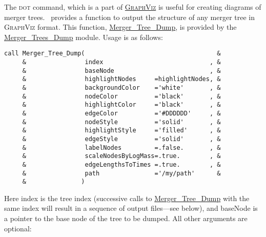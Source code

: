 The {\normalfont \scshape dot} command, which is a part of \href{http://www.graphviz.org/}{{\normalfont \scshape GraphViz}} is useful for creating diagrams of merger trees. \glc\ provides a function to output the structure of any merger tree in {\normalfont \scshape GraphViz} format. This function, \hyperlink{objects.merger_trees.dump.F90:merger_trees_dump:merger_tree_dump}{{\normalfont \ttfamily Merger\_Tree\_Dump}}, is provided by the \hyperlink{objects.merger_trees.dump.F90:merger_trees_dump:merger_tree_dump}{{\normalfont \ttfamily Merger\_Trees\_Dump}} module. Usage is as follows:
\begin{lstlisting}[escapechar=@,breaklines,prebreak=\&,postbreak=\&]
call Merger_Tree_Dump(                                    &
     &                index                             , &
     &                baseNode                          , &
     &                highlightNodes     =highlightNodes, &
     &                backgroundColor    ='white'       , &
     &                nodeColor          ='black'       , &
     &                highlightColor     ='black'       , &
     &                edgeColor          ='#DDDDDD'     , &
     &                nodeStyle          ='solid'       , &
     &                highlightStyle     ='filled'      , &
     &                edgeStyle          ='solid'       , &
     &                labelNodes         =.false.       , &
     &                scaleNodesByLogMass=.true.        , &
     &                edgeLengthsToTimes =.true.        , &
     &                path               ='/my/path'      &
     &               )
\end{lstlisting}
Here {\normalfont \ttfamily index} is the tree index (successive calls to \hyperlink{objects.merger_trees.dump.F90:merger_trees_dump:merger_tree_dump}{{\normalfont \ttfamily Merger\_Tree\_Dump}} with the same index will result in a sequence of output files---see below), and {\normalfont \ttfamily baseNode} is a pointer to the base node of the tree to be dumped. All other arguments are optional:
